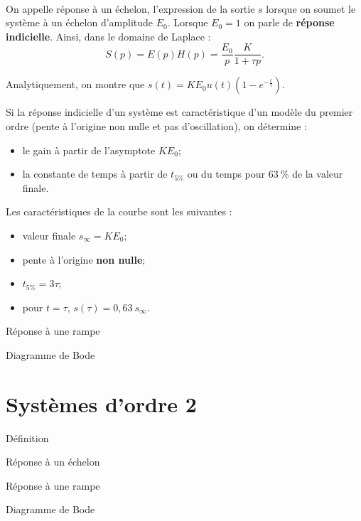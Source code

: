 \documentclass[10pt,fleqn]{article} %
\begin{document}
\begin{resultat}~\\
On appelle réponse à un échelon, l'expression de la sortie $s$ lorsque on soumet le système à un échelon d'amplitude $E_0$. Lorsque $E_0=1$ on parle de \textbf{réponse indicielle}.
Ainsi, dans le domaine de Laplace :
$$
S(p)=E(p)H(p) = \dfrac{E_0}{p} \dfrac{K}{1+\tau p}.
$$ 

Analytiquement, on montre que $s(t)=K E_0 u(t) \left(1-e^{-\frac{t}{\tau}}\right)$. 


\noindent \begin{minipage}[c]{.65\linewidth}

Si la réponse indicielle d'un système est caractéristique d'un modèle du premier ordre (pente à l'origine non nulle et pas d'oscillation), on détermine :
\begin{itemize}
\item le gain à partir de l'asymptote $K E_0$;
\item la constante de temps à partir de $t_{5\%}$ ou du temps pour $63~\%$ de la valeur finale.%
\end{itemize}
Les caractéristiques de la courbe sont les suivantes : 
\begin{itemize}
\item valeur finale $s_{\infty}=K E_0$;
\item pente à l'origine \textbf{non nulle};
\item $t_{5\%}=3\tau$;
\item pour $t=\tau$, $s(\tau)=0,63~ s_{\infty}$.
\end{itemize}
\end{minipage} \hfill
\begin{minipage}[c]{.32\linewidth}
\centering

\end{minipage}
\end{resultat}

Réponse à une rampe

Diagramme de Bode


\section{Systèmes d'ordre 2}
Définition

Réponse à un échelon 

Réponse à une rampe

Diagramme de Bode
\end{document}

